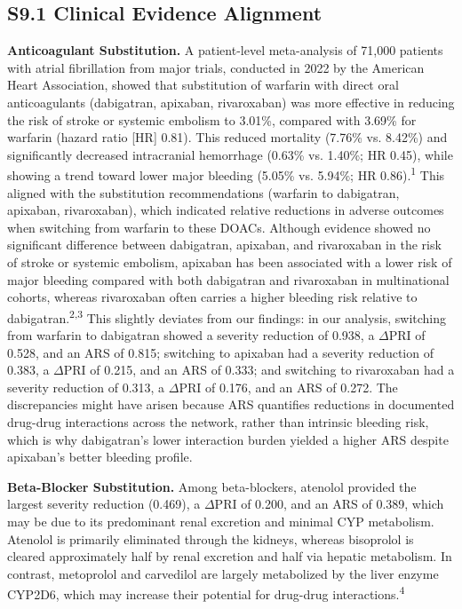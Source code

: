 \documentclass[12pt,a4paper]{article}
\begin{document}
\subsection{S9.1 Clinical Evidence Alignment}

\textbf{Anticoagulant Substitution.} A patient-level meta-analysis of 71,000 patients with atrial fibrillation from major trials, conducted in 2022 by the American Heart Association, showed that substitution of warfarin with direct oral anticoagulants (dabigatran, apixaban, rivaroxaban) was more effective in reducing the risk of stroke or systemic embolism to 3.01\%, compared with 3.69\% for warfarin (hazard ratio [HR] 0.81). This reduced mortality (7.76\% vs. 8.42\%) and significantly decreased intracranial hemorrhage (0.63\% vs. 1.40\%; HR 0.45), while showing a trend toward lower major bleeding (5.05\% vs. 5.94\%; HR 0.86).\textsuperscript{1} This aligned with the substitution recommendations (warfarin to dabigatran, apixaban, rivaroxaban), which indicated relative reductions in adverse outcomes when switching from warfarin to these DOACs. Although evidence showed no significant difference between dabigatran, apixaban, and rivaroxaban in the risk of stroke or systemic embolism, apixaban has been associated with a lower risk of major bleeding compared with both dabigatran and rivaroxaban in multinational cohorts, whereas rivaroxaban often carries a higher bleeding risk relative to dabigatran.\textsuperscript{2,3} This slightly deviates from our findings: in our analysis, switching from warfarin to dabigatran showed a severity reduction of 0.938, a $\Delta$PRI of 0.528, and an ARS of 0.815; switching to apixaban had a severity reduction of 0.383, a $\Delta$PRI of 0.215, and an ARS of 0.333; and switching to rivaroxaban had a severity reduction of 0.313, a $\Delta$PRI of 0.176, and an ARS of 0.272. The discrepancies might have arisen because ARS quantifies reductions in documented drug-drug interactions across the network, rather than intrinsic bleeding risk, which is why dabigatran's lower interaction burden yielded a higher ARS despite apixaban's better bleeding profile.

\textbf{Beta-Blocker Substitution.} Among beta-blockers, atenolol provided the largest severity reduction (0.469), a $\Delta$PRI of 0.200, and an ARS of 0.389, which may be due to its predominant renal excretion and minimal CYP metabolism. Atenolol is primarily eliminated through the kidneys, whereas bisoprolol is cleared approximately half by renal excretion and half via hepatic metabolism. In contrast, metoprolol and carvedilol are largely metabolized by the liver enzyme CYP2D6, which may increase their potential for drug-drug interactions.\textsuperscript{4}
\end{document}
